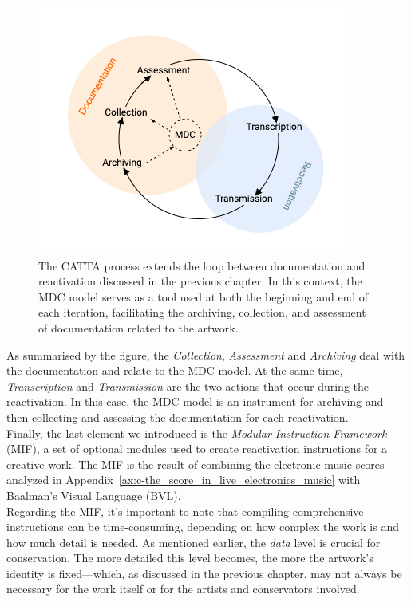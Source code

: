 \begin{figure}[!h]
    \centering
    \includegraphics[width=0.8\linewidth]{chapters/3-mdc_model-reactivation_workflow-instruction_template/image/graph03-mdc-catta.png}
    \caption{The CATTA process extends the loop between documentation and reactivation discussed in the previous chapter. In this context, the MDC model serves as a tool used at both the beginning and end of each iteration, facilitating the archiving, collection, and assessment of documentation related to the artwork.}
    \label{fig:c3-mdc-catta}
\end{figure}
As summarised by the figure, the \textit{Collection}, \textit{Assessment} and \textit{Archiving} deal with the documentation and relate to the MDC model. At the same time, \textit{Transcription} and \textit{Transmission} are the two actions that occur during the reactivation. In this case, the MDC model is an instrument for archiving and then collecting and assessing the documentation for each reactivation.\\
Finally, the last element we introduced is the \textit{Modular Instruction Framework} (MIF), a set of optional modules used to create reactivation instructions for a creative work. The MIF is the result of combining the electronic music scores analyzed in Appendix~\ref{ax:c-the_score_in_live_electronics_music} with Baalman’s Visual Language (BVL).\\
Regarding the MIF, it’s important to note that compiling comprehensive instructions can be time-consuming, depending on how complex the work is and how much detail is needed. As mentioned earlier, the \textit{data} level is crucial for conservation. The more detailed this level becomes, the more the artwork’s identity is fixed—which, as discussed in the previous chapter, may not always be necessary for the work itself or for the artists and conservators involved.


